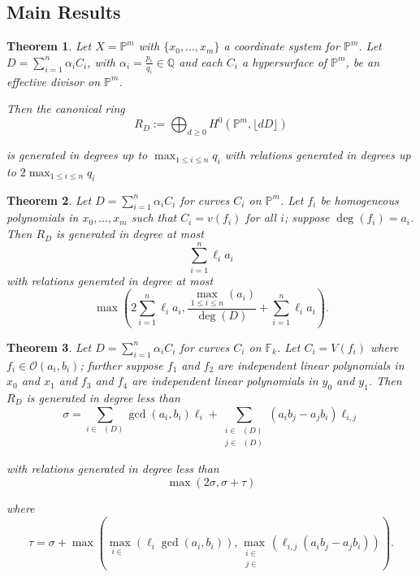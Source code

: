 \documentclass{amsart}
\theoremstyle{plain}
\newtheorem{thm}{Theorem}[section]
\theoremstyle{definition}
\theoremstyle{remark}
\numberwithin{equation}{section}
\newcommand\ssec{\subsection}
\newcommand\bq{{\mathbb Q}}
\newcommand\bp{{\mathbb P}}
\newcommand\sco{{\mathscr O}}
\newcommand\bida{a}
\newcommand\bidb{b}
\newcommand\hirz{\mathbb{F}}
\DeclareMathOperator{\Te}{T_=}
\DeclareMathOperator{\Tp}{T_+}
\DeclareMathOperator{\Tm}{T_-}
\begin{document}

\ssec{Main Results}


\begin{thm}
\label{thm:proj-effective-intro}
Let $X = \bp^m$ with $\{x_0, \ldots, x_m\}$ a coordinate system for
$\bp^m$. Let $D = \sum_{i = 1}^{n} \alpha_i C_i$, with $\alpha_i =
\frac{p_i}{q_i} \in \bq$ and each $C_i$ a hypersurface of
$\bp^m$, be an effective divisor on $\bp^m$.

Then the canonical ring
\[
	R_D := \bigoplus_{d \geq 0} H^0(\bp^m, \lfloor dD \rfloor)
\]

\noindent
is generated in degrees up to $\max_{1 \leq i \leq n}{q_i}$ with
relations generated in degrees up to $2 \max_{1 \leq i \leq n}{q_i}$
\end{thm}


\begin{thm}
\label{proj-generators-relations-intro}
Let $D = \sum_{i=1}^n \alpha_i C_i$ for curves $C_i$ on $\mathbb{P}^m$.  Let
$f_i$ be homogeneous polynomials in $x_0, \ldots, x_m$ such that $C_i = v(f_i)$
for all $i$; suppose $\deg(f_i) = a_i$. 
Then $R_D$ is generated in degree at most 
\[
	\sum_{i=1}^n \ell_i a_i
\]
with relations generated in degree at most
\[
	\max \left(2 \sum_{i=1}^n \ell_i a_i, \frac{\max_{1\le i \le n}(\bida_i)}{\deg(D)} + \sum_{i=1}^n \ell_i a_i \right).
\]
\end{thm}


\begin{thm}
\label{lem:hirz-generators-relations}
Let $D = \sum_{i=1}^n \alpha_i C_i$ for curves $C_i$ on $\hirz_k$.  
Let $C_i = V(f_i)$ where $f_i \in \sco(a_i, b_i)$; further 
suppose $f_1$ and $f_2$ are independent linear
polynomials in $x_0$ and $x_1$ and $f_3$ and $f_4$ are independent
linear polynomials in $y_0$ and $y_1$.
Then $R_D$ is generated in degree less than 
\[
	\sigma = \sum_{i\in \Te(D)} \gcd(\bida_i, \bidb_i)\ell_i +
	\sum_{\substack{i	\in \Tp(D) \\	j \in \Tm(D)}} (\bida_i
	\bidb_j - \bida_j \bidb_i)\ell_{i,j}
\]

\noindent
with relations generated in degree less than 
\[
	\max(2 \sigma, \sigma + \tau)
\]

\noindent
where
\[
	\tau = \sigma
	+ \max \left( \max_{i\in \Te}(\ell_i \gcd(a_i, b_i)), \max_{
	\substack{i \in	\Tp \\ j\in \Tm}}(\ell_{i,j} (\bida_i \bidb_j
	- \bida_j \bidb_i))	\right).
\]
\end{thm}
\end{document}
